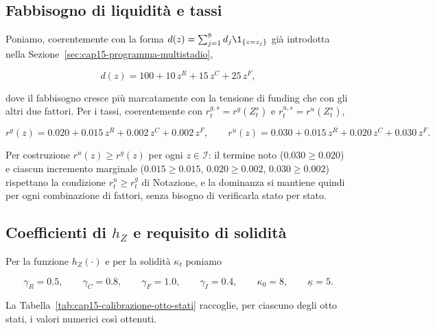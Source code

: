 \subsection{Fabbisogno di liquidit\`a e tassi}

Poniamo, coerentemente con la forma $d(z)=\sum_{j=1}^{8}d_j\1_{\{z=z_j\}}$
gi\`a introdotta nella Sezione~\ref{sec:cap15-programma-multistadio},

\[
d(z)=100+10\,z^R+15\,z^C+25\,z^F,
\]

dove il fabbisogno cresce pi\`u marcatamente con la tensione di funding
che con gli altri due fattori. Per i tassi, coerentemente con
$r_t^{g,s}=r^g(Z_t^s)$ e $r_t^{u,s}=r^u(Z_t^s)$,

\[
r^g(z)=0.020+0.015\,z^R+0.002\,z^C+0.002\,z^F,
\qquad
r^u(z)=0.030+0.015\,z^R+0.020\,z^C+0.030\,z^F.
\]

\begin{remark}

Per costruzione $r^u(z)\geq r^g(z)$ per ogni $z\in\mathcal I$: il termine
noto ($0.030\geq0.020$) e ciascun incremento marginale
($0.015\geq0.015$, $0.020\geq0.002$, $0.030\geq0.002$) rispettano la
condizione $r_t^u\geq r_t^g$ di Notazione, e la dominanza si mantiene
quindi per ogni combinazione di fattori, senza bisogno di verificarla
stato per stato.

\end{remark}

\subsection{Coefficienti di $h_Z$ e requisito di solidit\`a}

Per la funzione $h_Z(\cdot)$ e per la solidit\`a $\kappa_t$ poniamo

\[
\gamma_R=0.5,\qquad\gamma_C=0.8,\qquad\gamma_F=1.0,\qquad\gamma_I=0.4,
\qquad
\kappa_0=8,\qquad\underline\kappa=5.
\]

La Tabella~\ref{tab:cap15-calibrazione-otto-stati} raccoglie, per ciascuno
degli otto stati, i valori numerici cos\`i ottenuti.

